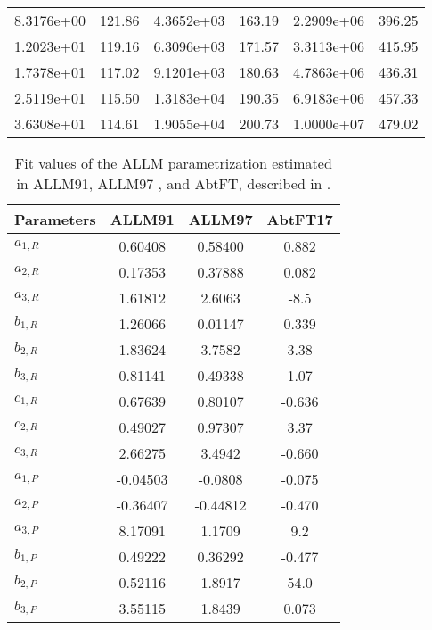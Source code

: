 \begin{table}
\begin{tabular}{S[table-format=1.4e+1] S[table-format=3.6] | S S[table-format=3.2] | S S[table-format=3.2]}
        8.3176e+00 & 121.86 & 4.3652e+03 & 163.19 & 2.2909e+06 & 396.25 \\
        1.2023e+01 & 119.16 & 6.3096e+03 & 171.57 & 3.3113e+06 & 415.95 \\
        1.7378e+01 & 117.02 & 9.1201e+03 & 180.63 & 4.7863e+06 & 436.31 \\
        2.5119e+01 & 115.50 & 1.3183e+04 & 190.35 & 6.9183e+06 & 457.33 \\
        3.6308e+01 & 114.61 & 1.9055e+04 & 200.73 & 1.0000e+07 & 479.02 \\
        \bottomrule
    \end{tabular}
\end{table}

\begin{table}
    \caption{Fit values of the ALLM parametrization estimated in ALLM91\cite{Abramowicz91}, ALLM97 \cite{Abramowicz97}, and AbtFT\cite{Abt17PhotoQ2}, described in .}
    \label{tab:photo_q2_params}
    \begin{center}
    \begin{tabular}{l | S[table-format=+2.5] S[table-format=+2.5] S[table-format=+2.4]}
        \toprule
        Parameters & {ALLM91} & {ALLM97} & {AbtFT17} \\
        \midrule
        $a_{1,R}$ & 0.60408 & 0.58400 & 0.882 \\
        $a_{2,R}$ & 0.17353 & 0.37888 & 0.082 \\
        $a_{3,R}$ & 1.61812 & 2.6063 & -8.5 \\
        $b_{1,R}$ & 1.26066 & 0.01147 & 0.339 \\
        $b_{2,R}$ & 1.83624 & 3.7582 & 3.38 \\
        $b_{3,R}$ & 0.81141 & 0.49338 & 1.07 \\
        $c_{1,R}$ & 0.67639 & 0.80107 & -0.636 \\
        $c_{2,R}$ & 0.49027 & 0.97307 & 3.37 \\
        $c_{3,R}$ & 2.66275 & 3.4942 & -0.660 \\
        \midrule
        $a_{1,P}$ & -0.04503 & -0.0808 & -0.075 \\
        $a_{2,P}$ & -0.36407 & -0.44812 & -0.470 \\
        $a_{3,P}$ & 8.17091 & 1.1709 & 9.2 \\
        $b_{1,P}$ & 0.49222 & 0.36292 & -0.477 \\
        $b_{2,P}$ & 0.52116 & 1.8917 & 54.0 \\
        $b_{3,P}$ & 3.55115 & 1.8439 & 0.073 \\

\end{tabular}
\end{center}
\end{table}
